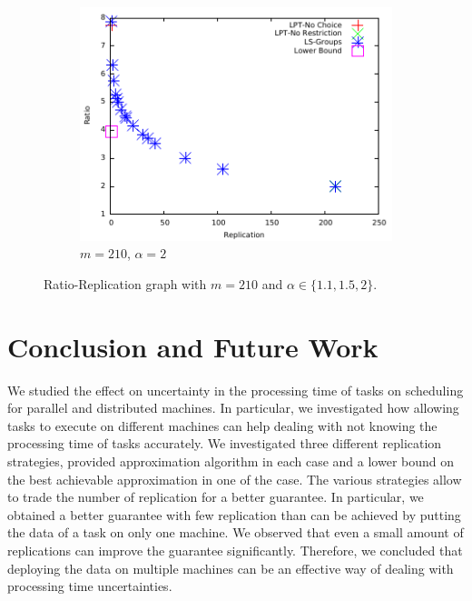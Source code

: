 \documentclass[10pt, conference, compsocconf]{IEEEtran}
\begin{document}
\begin {figure}
  \begin{subfigure}[b]{0.5\textwidth}
    \includegraphics[width=\textwidth]{alpha_2.pdf}
    \caption{$m=210$, $\alpha=2$}
    \label{fig:3}
  \end{subfigure} %

  \caption{Ratio-Replication graph with $m=210$ and $\alpha \in \{1.1, 1.5, 2\}$.}
  \label{fig:Graph}
\end{figure}

\section{Conclusion and Future Work}\label{sec8}

We studied the effect on uncertainty in the processing time of tasks
on scheduling for parallel and distributed machines. In particular, we
investigated how allowing tasks to execute on different machines can
help dealing with not knowing the processing time of tasks
accurately. We investigated three different replication strategies,
provided approximation algorithm in each case and a lower bound on the
best achievable approximation in one of the case. The various
strategies allow to trade the number of replication for a better
guarantee. In particular, we obtained a better guarantee with few
replication than can be achieved by putting the data of a task on only
one machine. We observed that even a small amount of replications can
improve the guarantee significantly. Therefore, we concluded that
deploying the data on multiple machines can be an effective way of
dealing with processing time uncertainties.
\end{document}
